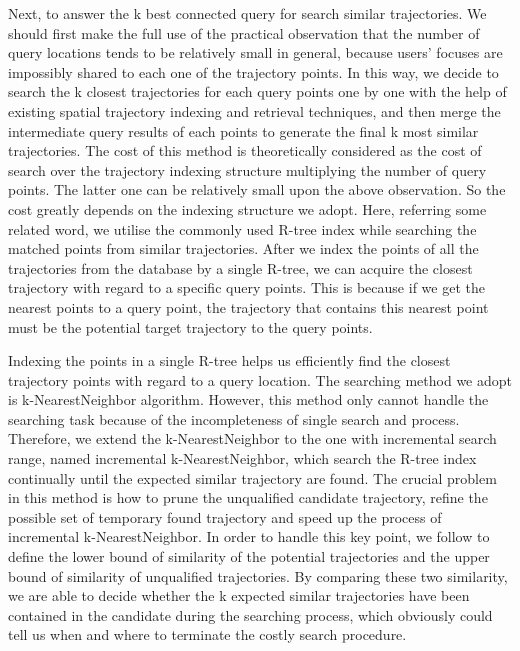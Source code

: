 \begin{bigabstract}
Next, to answer the k best connected query for search similar trajectories. We should first make the full use of the practical observation that the number of query locations tends to be relatively small in general, because users' focuses are impossibly shared to each one of the trajectory points. In this way, we decide to search the k closest trajectories for each query points one by one with the help of existing spatial trajectory indexing and retrieval techniques, and then merge the intermediate query results of each points to generate the final k most similar trajectories. The cost of this method is theoretically considered as the cost of search over the trajectory indexing structure multiplying the number of query points. The latter one can be relatively small upon the above observation. So the cost greatly depends on the indexing structure we adopt. Here, referring some related word, we utilise the commonly used R-tree index while searching the matched points from similar trajectories. After we index the points of all the trajectories from the database by a single R-tree, we can acquire the closest trajectory with regard to a specific query points. This is because if we get the nearest points to a query point, the trajectory that contains this nearest point must be the potential target trajectory to the query points.

Indexing the points in a single R-tree helps us efficiently find the closest trajectory points with regard to a query location. The searching method we adopt is k-NearestNeighbor algorithm. However, this method only cannot handle the searching task because of the incompleteness of single search and process. Therefore, we extend the k-NearestNeighbor to the one with incremental search range, named incremental k-NearestNeighbor, which search the R-tree index continually until the expected similar trajectory are found. The crucial problem in this method is how to prune the unqualified candidate trajectory, refine the possible set of temporary found trajectory and speed up the process of incremental k-NearestNeighbor. In order to handle this key point, we follow to define the lower bound of similarity of the potential trajectories and the upper bound of similarity of unqualified trajectories. By comparing these two similarity, we are able to decide whether the k expected similar trajectories have been contained in the candidate during the searching process, which obviously could tell us when and where to terminate the costly search procedure. 


\end{bigabstract}
